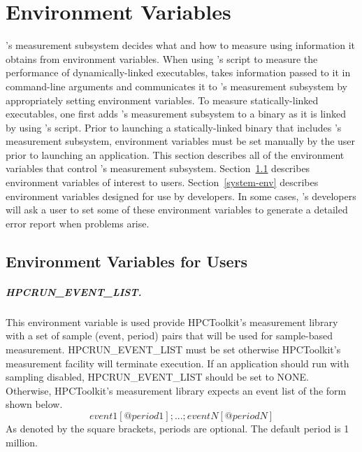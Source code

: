 \newcommand{\parg}{\vspace{1ex}\noindent}

\chapter{Environment Variables}

\HPCToolkit{}'s measurement subsystem decides what and how to measure
using information it obtains from environment variables.  When using
\HPCToolkit{}'s \hpcrun{} script to measure the performance of
dynamically-linked executables, \hpcrun{} takes information passed
to it in command-line arguments and communicates it to \HPCToolkit{}'s
measurement subsystem by appropriately setting environment variables.
To measure statically-linked executables, one first adds \HPCToolkit's
measurement subsystem to a binary as it is linked by using \HPCToolkit's
\hpclink script. Prior to launching a statically-linked binary that
includes \HPCToolkit's measurement subsystem, environment variables
must be set manually by the user prior to launching an application.
This section describes all of the environment variables that control
\HPCToolkit's measurement subsystem. Section~\ref{user-env} describes
environment variables of interest to users. Section~\ref{system-env}
describes environment variables designed for use by \HPCToolkit{}
developers. In some cases, \HPCToolkit's developers will ask a user
to set some of these environment variables to generate a detailed error 
report when problems arise.

\section{Environment Variables for Users}
\label{user-env}

\paragraph{HPCRUN\_EVENT\_LIST.}

This environment variable is used provide
HPCToolkit's measurement library with a set of sample (event, period)
pairs that will be used for sample-based measurement. HPCRUN\_EVENT\_LIST
must be set otherwise HPCToolkit's measurement facility will terminate
execution. If an application should run with sampling disabled,
HPCRUN\_EVENT\_LIST should be set to NONE. Otherwise, HPCToolkit's
measurement library expects an event list of the form shown below.
$$event1[@period1];...;eventN[@periodN]$$ As denoted by the
square brackets, periods are optional. The default period is 1
million.

